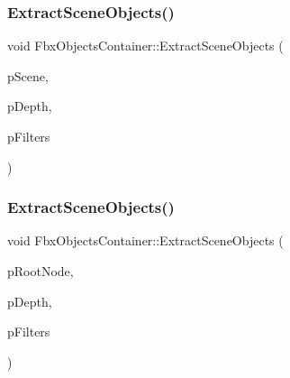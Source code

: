 \mbox{\label{class_fbx_objects_container_a1d60cd980f37affb7bcb64f9cf53f710}} 
\subsubsection{\texorpdfstring{Extract\+Scene\+Objects()}{ExtractSceneObjects()}\hspace{0.1cm}{\footnotesize\ttfamily [1/2]}}
{\footnotesize\ttfamily void Fbx\+Objects\+Container\+::\+Extract\+Scene\+Objects (\begin{DoxyParamCaption}\item[{\hyperlink{class_fbx_scene}{Fbx\+Scene} $\ast$}]{p\+Scene,  }\item[{\hyperlink{class_fbx_objects_container_a70f47fef529be83cb1b45c0e067d73e5}{E\+Depth}}]{p\+Depth,  }\item[{const \hyperlink{fbxobjectscontainer_8h_a74af631b21bcb9d44e73d3293bf785df}{Fbx\+Attribute\+Filters} \&}]{p\+Filters }\end{DoxyParamCaption})}

\mbox{\label{class_fbx_objects_container_a7fdcdc24f3c61c3f2001b13f16d7528d}} 
\subsubsection{\texorpdfstring{Extract\+Scene\+Objects()}{ExtractSceneObjects()}\hspace{0.1cm}{\footnotesize\ttfamily [2/2]}}
{\footnotesize\ttfamily void Fbx\+Objects\+Container\+::\+Extract\+Scene\+Objects (\begin{DoxyParamCaption}\item[{\hyperlink{class_fbx_node}{Fbx\+Node} $\ast$}]{p\+Root\+Node,  }\item[{\hyperlink{class_fbx_objects_container_a70f47fef529be83cb1b45c0e067d73e5}{E\+Depth}}]{p\+Depth,  }\item[{const \hyperlink{fbxobjectscontainer_8h_a74af631b21bcb9d44e73d3293bf785df}{Fbx\+Attribute\+Filters} \&}]{p\+Filters }\end{DoxyParamCaption})}

